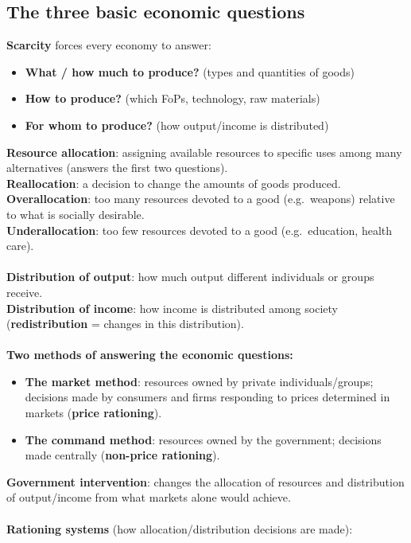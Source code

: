 \documentclass[a4paper,12pt]{article}
\begin{document}
\subsection{The three basic economic questions}
\textbf{Scarcity} forces every economy to answer:
\begin{itemize}
  \item \textbf{What / how much to produce?} (types and quantities of goods)
  \item \textbf{How to produce?} (which FoPs, technology, raw materials)
  \item \textbf{For whom to produce?} (how output/income is distributed)
\end{itemize}
\textbf{Resource allocation}: assigning available resources to specific uses among many alternatives (answers the first two questions).\\
\textbf{Reallocation}: a decision to change the amounts of goods produced.\\
\textbf{Overallocation}: too many resources devoted to a good (e.g.\ weapons) relative to what is socially desirable.\\
\textbf{Underallocation}: too few resources devoted to a good (e.g.\ education, health care).\\\\
\textbf{Distribution of output}: how much output different individuals or groups receive.\\
\textbf{Distribution of income}: how income is distributed among society (\textbf{redistribution} = changes in this distribution).\\\\
\textbf{Two methods of answering the economic questions:}
\begin{itemize}
  \item \textbf{The market method}: resources owned by private individuals/groups; decisions made by consumers and firms responding to prices determined in markets (\textbf{price rationing}).
  \item \textbf{The command method}: resources owned by the government; decisions made centrally (\textbf{non-price rationing}).
\end{itemize}
\textbf{Government intervention}: changes the allocation of resources and distribution of output/income from what markets alone would achieve.\\\\
\textbf{Rationing systems} (how allocation/distribution decisions are made):
\end{document}
